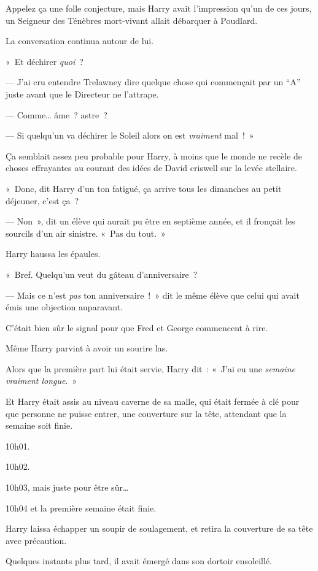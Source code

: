 Appelez ça une folle conjecture, mais Harry avait l'impression qu'un de ces jours, un Seigneur des Ténèbres mort-vivant allait débarquer à Poudlard.

La conversation continua autour de lui.

«~Et déchirer \emph{quoi}~?

--- J'ai cru entendre Trelawney dire quelque chose qui commençait par un “A” juste avant que le Directeur ne l'attrape.

--- Comme… âme~? astre~?

--- Si quelqu'un va déchirer le Soleil alors on est \emph{vraiment} mal~!~»

Ça semblait assez peu probable pour Harry, à moins que le monde ne recèle de choses effrayantes au courant des idées de David criswell sur la levée stellaire.

«~Donc, dit Harry d'un ton fatigué, ça arrive tous les dimanches au petit déjeuner, c'est ça~?

--- Non~», dit un élève qui aurait pu être en septième année, et il fronçait les sourcils d'un air sinistre.
«~Pas du tout.~»

Harry haussa les épaules.

«~Bref. Quelqu'un veut du gâteau d'anniversaire~?

--- Mais ce n'est \emph{pas} ton anniversaire~!~»
dit le même élève que celui qui avait émis une objection auparavant.

C'était bien sûr le signal pour que Fred et George commencent à rire.

Même Harry parvint à avoir un sourire las.

Alors que la première part lui était servie, Harry dit~: «~J'ai eu une \emph{semaine vraiment longue}.~»

\later

Et Harry était assis au niveau caverne de sa malle, qui était fermée à clé pour que personne ne puisse entrer, une couverture sur la tête, attendant que la semaine soit finie.

10h01.

10h02.

10h03, mais juste pour être sûr…

10h04 et la première semaine était finie.

Harry laissa échapper un soupir de soulagement, et retira la couverture de sa tête avec précaution.

Quelques instants plus tard, il avait émergé dans son dortoir ensoleillé.

